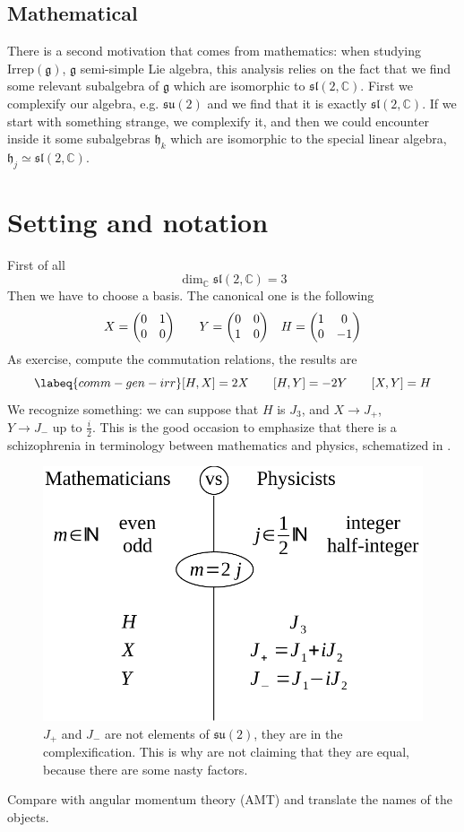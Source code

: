 \documentclass[../main.tex]{subfiles}
\begin{document}
\subsection{Mathematical}
There is a second motivation that comes from mathematics: when studying $\textrm{Irrep}(\mathfrak{g})$, $\mathfrak{g}$ semi-simple Lie algebra, this analysis relies on the fact that we find some relevant subalgebra of $\mathfrak{g}$ which are isomorphic to $\mathfrak{sl}(2,\mathbb{C})$. First we complexify our algebra, e.g. $\mathfrak{su}(2)$ and we find that it is exactly $\mathfrak{sl}(2,\mathbb{C})$. If we start with something strange, we complexify it, and then we could encounter inside it some subalgebras $\mathfrak{h}_k$ which are isomorphic to the special linear algebra, $\mathfrak{h}_j\simeq\mathfrak{sl}(2,\mathbb{C})$.
\section{Setting and notation}
First of all
\[
\dim_{\mathbb{C}}\mathfrak{sl}(2,\mathbb{C})=3
\]
Then we have to choose a basis. The canonical one is the following
\[
X=\mqty(\admat[0]{1,0}) \qquad Y=\mqty(\admat[0]{0,1}) \quad H=\mqty(\dmat[0]{1,-1})
\]
As exercise, compute the commutation relations, the results are
\begin{equation}\labeq{comm-gen-irr}
\comm{H}{X}=2X \qquad \comm{H}{Y}=-2Y \qquad \comm{X}{Y}=H
\end{equation}
We recognize something: we can suppose that $H$ is $J_3$, and $X\to J_+$, \\
$Y\to J_-$ up to $\frac{i}{2}$. This is the good occasion to emphasize that there is a schizophrenia in terminology between mathematics and physics, schematized in .
\begin{figure}[h!]
	\includegraphics[width=1\linewidth]{images/schizzo_not.pdf}
	\caption[Schizophrenic terminology scheme between mathematics and physics]{$J_+$ and $J_-$ are not elements of $\mathfrak{su}(2)$, they are in the complexification. This is why are not claiming that they are equal, because there are some nasty factors.}
\end{figure}
\begin{exercise}
Compare with angular momentum theory (AMT) and translate the names of the objects.
\end{exercise}
\end{document}
